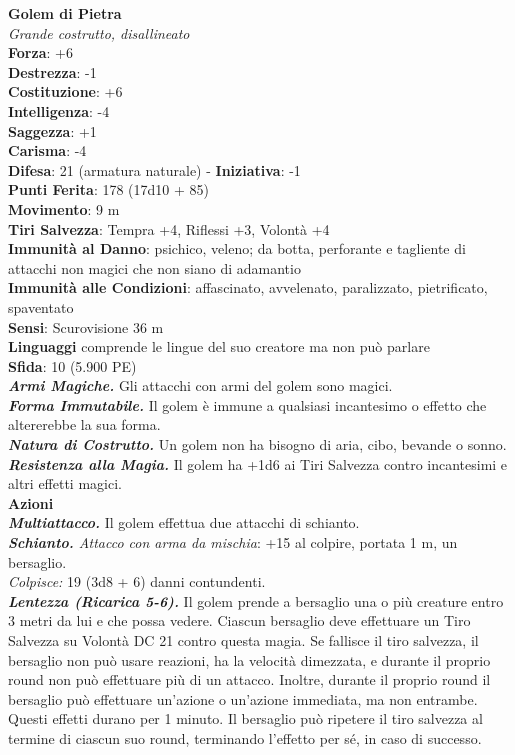 \begin{multicols}{2}
\medskip\textbf{Golem di Pietra}\\
\emph{Grande costrutto, disallineato}\\
\textbf{Forza}: +6 \\
\textbf{Destrezza}: -1\\
\textbf{Costituzione}: +6\\
\textbf{Intelligenza}: -4\\
\textbf{Saggezza}: +1\\
\textbf{Carisma}: -4\\
\textbf{Difesa}: 21 (armatura naturale) - \textbf{Iniziativa}: -1\\
\textbf{Punti Ferita}: 178 (17d10 + 85)\\
\textbf{Movimento}: 9 m\\
\textbf{Tiri Salvezza}: Tempra +4, Riflessi +3, Volontà +4\\
\textbf{Immunità al Danno}: psichico, veleno; da botta, perforante e tagliente di attacchi non magici che non siano di adamantio\\
\textbf{Immunità alle Condizioni}: affascinato, avvelenato, paralizzato, pietrificato, spaventato\\
\textbf{Sensi}: Scurovisione 36 m\\
\textbf{Linguaggi} comprende le lingue del suo creatore ma non può parlare\\
\textbf{Sfida}: 10 (5.900 PE)\smallskip\\
\emph{\textbf{Armi Magiche.}} Gli attacchi con armi del golem sono magici.\\
\emph{\textbf{Forma Immutabile.}} Il golem è immune a qualsiasi incantesimo o effetto che altererebbe la sua forma.\\
\emph{\textbf{Natura di Costrutto.}} Un golem non ha bisogno di aria, cibo, bevande o sonno.\\
\emph{\textbf{Resistenza alla Magia.}} Il golem ha +1d6 ai Tiri Salvezza contro incantesimi e altri effetti magici.\\
\smallskip\textbf{Azioni} \\
\emph{\textbf{Multiattacco.}} Il golem effettua due attacchi di schianto.\\
\emph{\textbf{Schianto.} Attacco con arma da mischia}: +15 al colpire, portata 1 m, un bersaglio.\\
\emph{Colpisce:} 19 (3d8 + 6) danni contundenti.\\
\emph{\textbf{Lentezza (Ricarica 5-6).}} Il golem prende a bersaglio una o più creature entro 3 metri da lui e che possa vedere. Ciascun bersaglio deve effettuare un Tiro Salvezza su Volontà DC  21 contro questa magia. Se fallisce il tiro salvezza, il bersaglio non può usare reazioni, ha la velocità dimezzata, e durante il proprio round non può effettuare più di un attacco. Inoltre,  durante il proprio round il bersaglio può effettuare un'azione o un'azione immediata, ma non entrambe. Questi effetti durano per 1 minuto. Il bersaglio può ripetere il tiro salvezza al termine di ciascun suo round, terminando l'effetto per sé, in caso di successo.\\

\end{multicols}
